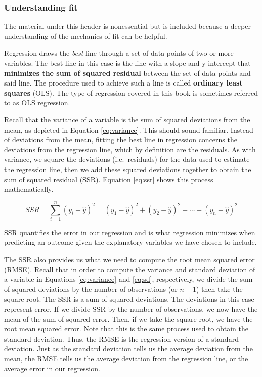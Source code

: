\documentclass[
]{book}
\newenvironment{announcement}%
{%
  \par\vspace{\baselineskip}\noindent 
  \color{Announcement}\begin{itshape}%
  \par\vspace{\baselineskip}\noindent\ignorespaces 
}%
{%
  \end{itshape}\ignorespacesafterend 
}
\begin{document}
\hypertarget{understanding-fit}{%
\subsubsection*{Understanding fit}\label{understanding-fit}}

\begin{announcement}
The material under this header is nonessential but is included because a
deeper understanding of the mechanics of fit can be helpful.
\end{announcement}

Regression draws the \emph{best} line through a set of data points of two or more variables. The best line in this case is the line with a slope and y-intercept that \textbf{minimizes the sum of squared residual} between the set of data points and said line. The procedure used to achieve such a line is called \textbf{ordinary least squares} (OLS). The type of regression covered in this book is sometimes referred to as OLS regression.

Recall that the variance of a variable is the sum of squared deviations from the mean, as depicted in Equation \eqref{eq:variance}. This should sound familiar. Instead of deviations from the mean, fitting the best line in regression concerns the deviations from the regression line, which by definition are the residuals. As with variance, we square the deviations (i.e.~residuals) for the data used to estimate the regression line, then we add these squared deviations together to obtain the sum of squared residual (SSR). Equation \eqref{eq:ssr} shows this process mathematically.

\begin{equation}
SSR=\sum _{i=1}^{n}(y_{i}-\hat{y})^2= (y_{1}-\hat{y})^2+(y_{2}-\hat{y})^2+\cdots +(y_{n}-\hat{y})^2
\label{eq:ssr}
\end{equation}

SSR quantifies the error in our regression and is what regression minimizes when predicting an outcome given the explanatory variables we have chosen to include.

The SSR also provides us what we need to compute the root mean squared error (RMSE). Recall that in order to compute the variance and standard deviation of a variable in Equations \eqref{eq:variance} and \eqref{eq:sd}, respectively, we divide the sum of squared deviations by the number of observations (or \(n-1\)) then take the square root. The SSR is a sum of squared deviations. The deviations in this case represent error. If we divide SSR by the number of observations, we now have the mean of the sum of squared error. Then, if we take the square root, we have the root mean squared error. Note that this is the same process used to obtain the standard deviation. Thus, the RMSE is the regression version of a standard deviation. Just as the standard deviation tells us the average deviation from the mean, the RMSE tells us the average deviation from the regression line, or the average error in our regression.
\end{document}
